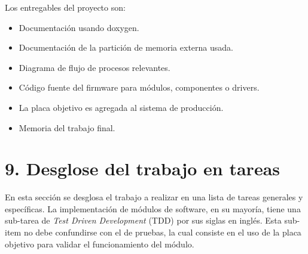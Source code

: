 \documentclass[
11pt, %
]{charter}
\begin{document}
Los entregables del proyecto son:

\begin{itemize}
	\item Documentación usando doxygen.
	\item Documentación de la partición de memoria externa usada.
	\item Diagrama de flujo de procesos relevantes.
	\item Código fuente del firmware para módulos, componentes o drivers.
	\item La placa objetivo es agregada al sistema de producción.
	\item Memoria del trabajo final.
\end{itemize}

\section{9. Desglose del trabajo en tareas}
\label{sec:wbs}

En esta sección se desglosa el trabajo a realizar en una lista de tareas generales y específicas. La implementación de módulos de software, en su mayoría, tiene una sub-tarea de \textit{Test Driven Development} (TDD) por sus siglas en inglés. Esta sub-item no debe confundirse con el de pruebas, la cual consiste en el uso de la placa objetivo para validar el funcionamiento del módulo.
\end{document}
